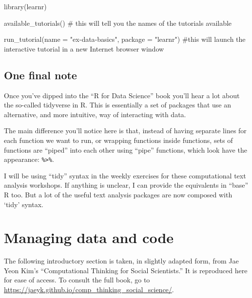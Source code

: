 \documentclass[
  letterpaper,
  DIV=11,
  numbers=noendperiod]{scrreprt}
\newenvironment{Shaded}{\begin{snugshade}}{\end{snugshade}}
\newcommand{\AttributeTok}[1]{\textcolor[rgb]{0.40,0.45,0.13}{#1}}
\newcommand{\CommentTok}[1]{\textcolor[rgb]{0.37,0.37,0.37}{#1}}
\newcommand{\FunctionTok}[1]{\textcolor[rgb]{0.28,0.35,0.67}{#1}}
\newcommand{\NormalTok}[1]{\textcolor[rgb]{0.00,0.23,0.31}{#1}}
\newcommand{\StringTok}[1]{\textcolor[rgb]{0.13,0.47,0.30}{#1}}
\begin{document}
\begin{Shaded}
\begin{Highlighting}[]
\FunctionTok{library}\NormalTok{(learnr)}

\FunctionTok{available\_tutorials}\NormalTok{() }\CommentTok{\# this will tell you the names of the tutorials available}

\FunctionTok{run\_tutorial}\NormalTok{(}\AttributeTok{name =} \StringTok{"ex{-}data{-}basics"}\NormalTok{, }\AttributeTok{package =} \StringTok{"learnr"}\NormalTok{) }\CommentTok{\#this will launch the interactive tutorial in a new Internet browser window}
\end{Highlighting}
\end{Shaded}

\hypertarget{one-final-note}{%
\section*{One final note}\label{one-final-note}}

Once you've dipped into the ``R for Data Science'' book you'll hear a
lot about the so-called tidyverse in R. This is essentially a set of
packages that use an alternative, and more intuitive, way of interacting
with data.

The main difference you'll notice here is that, instead of having
separate lines for each function we want to run, or wrapping functions
inside functions, sets of functions are ``piped'' into each other using
``pipe'' functions, which look have the appearance:
\texttt{\%\textgreater{}\%}.

I will be using ``tidy'' syntax in the weekly exercises for these
computational text analysis workshops. If anything is unclear, I can
provide the equivalents in ``base'' R too. But a lot of the useful text
analysis packages are now composed with `tidy' syntax.


\hypertarget{managing-data-and-code}{%
\chapter*{Managing data and code}\label{managing-data-and-code}}

\begin{tcolorbox}[enhanced jigsaw, rightrule=.15mm, opacityback=0, breakable, leftrule=.75mm, colframe=quarto-callout-note-color-frame, arc=.35mm, toprule=.15mm, bottomrule=.15mm, left=2mm, colback=white]
\begin{minipage}[t]{5.5mm}
\textcolor{quarto-callout-note-color}{\faInfo}
\end{minipage}%
\begin{minipage}[t]{\textwidth - 5.5mm}
The following introductory section is taken, in slightly adapted form,
from Jae Yeon Kim's ``Computational Thinking for Social Scientists.'' It
is reproduced here for ease of access. To consult the full book, go to
\url{https://jaeyk.github.io/comp_thinking_social_science/}.\end{minipage}%
\end{tcolorbox}
\end{document}
